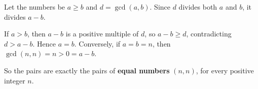 Let the numbers be $a\ge b$ and $d=\gcd(a,b)$. Since $d$ divides both $a$ and $b$, it divides $a-b$.

If $a>b$, then $a-b$ is a positive multiple of $d$, so $a-b\ge d$, contradicting $d>a-b$. Hence $a=b$. Conversely, if $a=b=n$, then $\gcd(n,n)=n>0=a-b$.

So the pairs are exactly the pairs of \textbf{equal numbers} $\boxed{(n,n)}$, for every positive integer $n$.
